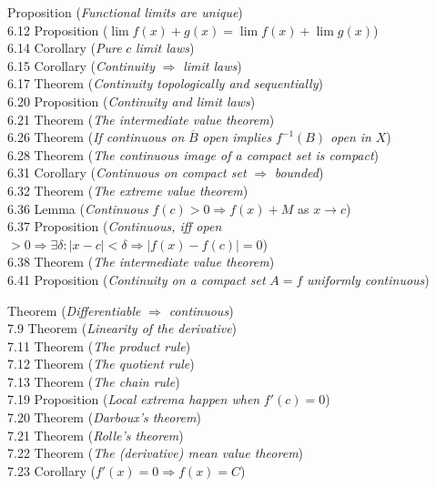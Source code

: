 \documentclass[12pt]{article}
\begin{document}
 Proposition (\emph{Functional limits are unique})  \\
6.12 Proposition ($\lim f(x) + g(x) = \lim f(x) + \lim g(x)$)  \\
6.14 Corollary (\emph{Pure} $c$ \emph{limit laws})  \\
6.15 Corollary (\emph{Continuity} $\Rightarrow$ \emph{limit laws})  \\
6.17 Theorem (\emph{Continuity topologically and sequentially})  \\
6.20 Proposition (\emph{Continuity and limit laws})  \\
6.21 Theorem (\emph{The intermediate value theorem})  \\
6.26 Theorem (\emph{If continuous on} $\overline{B}$ \emph{open implies} $f^{-1}(B)$ \emph{open in} $X$)  \\
6.28 Theorem (\emph{The continuous image of a compact set is compact})  \\
6.31 Corollary (\emph{Continuous on compact set} $\Rightarrow$ \emph{bounded})  \\
6.32 Theorem (\emph{The extreme value theorem})  \\
6.36 Lemma (\emph{Continuous} $f(c) > 0 \Rightarrow f(x) + M$ as $x \to c$)  \\
6.37 Proposition (\emph{Continuous, iff open} $> 0 \Rightarrow \exists \delta : |x - c| < \delta \Rightarrow |f(x) - f(c)| = 0$)  \\
6.38 Theorem (\emph{The intermediate value theorem})  \\
6.41 Proposition (\emph{Continuity on a compact set} $A = f$ \emph{uniformly continuous})  \\

\vspace{0.5em}

 Theorem (\emph{Differentiable} $\Rightarrow$ \emph{continuous})  \\
7.9 Theorem (\emph{Linearity of the derivative})  \\
7.11 Theorem (\emph{The product rule})  \\
7.12 Theorem (\emph{The quotient rule})  \\
7.13 Theorem (\emph{The chain rule})  \\
7.19 Proposition (\emph{Local extrema happen when} $f'(c) = 0$)  \\
7.20 Theorem (\emph{Darboux's theorem})  \\
7.21 Theorem (\emph{Rolle's theorem})  \\
7.22 Theorem (\emph{The (derivative) mean value theorem})  \\
7.23 Corollary ($f'(x) = 0 \Rightarrow f(x) = C$)  \\
\end{document}
